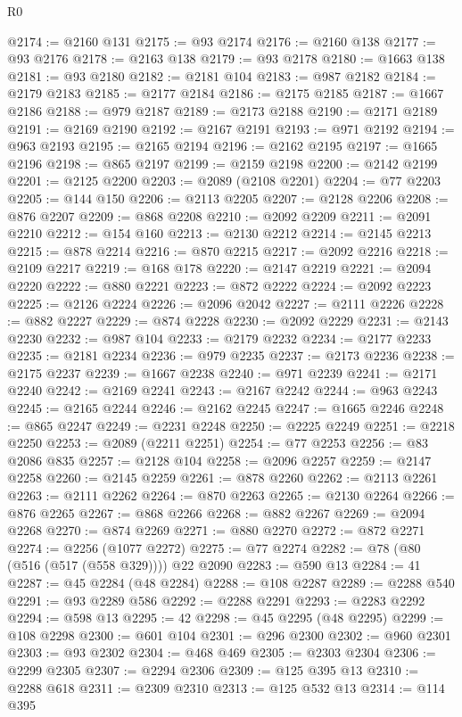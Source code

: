 \begin{lexlean}{R0}
\begin{coremodule}
@2174 := @2160 @131
@2175 := @93 @2174
@2176 := @2160 @138
@2177 := @93 @2176
@2178 := @2163 @138
@2179 := @93 @2178
@2180 := @1663 @138
@2181 := @93 @2180
@2182 := @2181 @104
@2183 := @987 @2182
@2184 := @2179 @2183
@2185 := @2177 @2184
@2186 := @2175 @2185
@2187 := @1667 @2186
@2188 := @979 @2187
@2189 := @2173 @2188
@2190 := @2171 @2189
@2191 := @2169 @2190
@2192 := @2167 @2191
@2193 := @971 @2192
@2194 := @963 @2193
@2195 := @2165 @2194
@2196 := @2162 @2195
@2197 := @1665 @2196
@2198 := @865 @2197
@2199 := @2159 @2198
@2200 := @2142 @2199
@2201 := @2125 @2200
@2203 := @2089 (@2108 @2201)
@2204 := @77 @2203
@2205 := @144 @150
@2206 := @2113 @2205
@2207 := @2128 @2206
@2208 := @876 @2207
@2209 := @868 @2208
@2210 := @2092 @2209
@2211 := @2091 @2210
@2212 := @154 @160
@2213 := @2130 @2212
@2214 := @2145 @2213
@2215 := @878 @2214
@2216 := @870 @2215
@2217 := @2092 @2216
@2218 := @2109 @2217
@2219 := @168 @178
@2220 := @2147 @2219
@2221 := @2094 @2220
@2222 := @880 @2221
@2223 := @872 @2222
@2224 := @2092 @2223
@2225 := @2126 @2224
@2226 := @2096 @2042
@2227 := @2111 @2226
@2228 := @882 @2227
@2229 := @874 @2228
@2230 := @2092 @2229
@2231 := @2143 @2230
@2232 := @987 @104
@2233 := @2179 @2232
@2234 := @2177 @2233
@2235 := @2181 @2234
@2236 := @979 @2235
@2237 := @2173 @2236
@2238 := @2175 @2237
@2239 := @1667 @2238
@2240 := @971 @2239
@2241 := @2171 @2240
@2242 := @2169 @2241
@2243 := @2167 @2242
@2244 := @963 @2243
@2245 := @2165 @2244
@2246 := @2162 @2245
@2247 := @1665 @2246
@2248 := @865 @2247
@2249 := @2231 @2248
@2250 := @2225 @2249
@2251 := @2218 @2250
@2253 := @2089 (@2211 @2251)
@2254 := @77 @2253
@2256 := @83 @2086 @835
@2257 := @2128 @104
@2258 := @2096 @2257
@2259 := @2147 @2258
@2260 := @2145 @2259
@2261 := @878 @2260
@2262 := @2113 @2261
@2263 := @2111 @2262
@2264 := @870 @2263
@2265 := @2130 @2264
@2266 := @876 @2265
@2267 := @868 @2266
@2268 := @882 @2267
@2269 := @2094 @2268
@2270 := @874 @2269
@2271 := @880 @2270
@2272 := @872 @2271
@2274 := @2256 (@1077 @2272)
@2275 := @77 @2274
@2282 := @78 (@80 (@516 (@517 (@558 @329)))) @22 @2090
@2283 := @590 @13
@2284 := 41
@2287 := @45 @2284 (@48 @2284)
@2288 := @108 @2287
@2289 := @2288 @540
@2291 := @93 @2289 @586
@2292 := @2288 @2291
@2293 := @2283 @2292
@2294 := @598 @13
@2295 := 42
@2298 := @45 @2295 (@48 @2295)
@2299 := @108 @2298
@2300 := @601 @104
@2301 := @296 @2300
@2302 := @960 @2301
@2303 := @93 @2302
@2304 := @468 @469
@2305 := @2303 @2304
@2306 := @2299 @2305
@2307 := @2294 @2306
@2309 := @125 @395 @13
@2310 := @2288 @618
@2311 := @2309 @2310
@2313 := @125 @532 @13
@2314 := @114 @395

\end{coremodule}
\end{lexlean}
